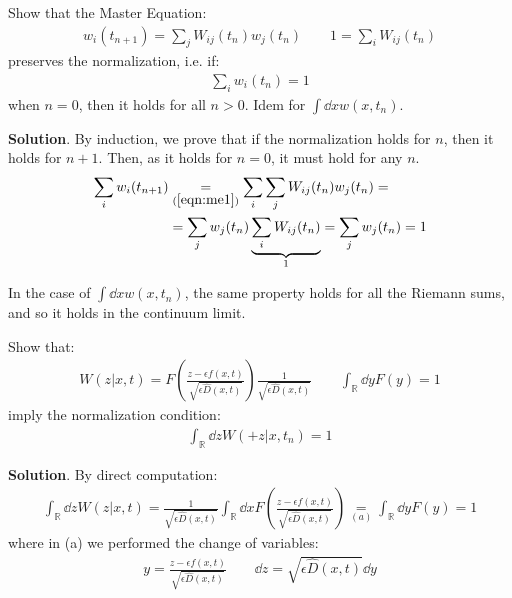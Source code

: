 \documentclass[../template.tex]{subfiles}
\begin{document}
\begin{exo}
    Show that the Master Equation:
    \begin{align}\label{eqn:me1}
        w_i(t_{n+1}) = \sum_{j} W_{ij}(t_n) w_j(t_n) \qquad 1 = \sum_{i} W_{ij}(t_n)
    \end{align}
    preserves the normalization, i.e. if:
    \begin{align*}
        \sum_{i} w_i(t_n) = 1
    \end{align*}
    when $n=0$, then it holds for all $n>0$. Idem for $\int \dd{x} w(x,t_n)$.

    \medskip

    \textbf{Solution}. By induction, we prove that if the normalization holds for $n$, then it holds for $n+1$. Then, as it holds for $n=0$, it must hold for any $n$.
    \begin{align*}
        \sum_{i} w_i(t_{n+1}) &\underset{(\ref{eqn:me1})}{=}   \sum_i \sum_j W_{ij}(t_n) w_j(t_n) =\\
        &= \sum_j w_j(t_n) \underbrace{\sum_i W_{ij}(t_n)}_{1}  = \sum_j w_j(t_n) = 1
    \end{align*}

    In the case of $\int \dd{x} w(x,t_n)$, the same property holds for all the Riemann sums, and so it holds in the continuum limit.
\end{exo}

\begin{exo}
Show that:
\begin{align}\label{eqn:jump}
    W(z|x,t) = F\left(\frac{z-\epsilon f(x,t)}{\sqrt{\epsilon \hat{D}(x,t)}} \right) \frac{1}{\sqrt{\epsilon \hat{D}(x,t)}} \qquad \int_{\mathbb{R}} \dd{y} F(y) = 1
\end{align}
imply the normalization condition:
\begin{align*}
    \int_{\mathbb{R}} \dd{z} W(+z|x,t_n) = 1
\end{align*}   

\medskip

\textbf{Solution}. By direct computation:
\begin{align*}
    \int_{\mathbb{R}} \dd{z} W(z|x,t) = \frac{1}{\sqrt{\epsilon \hat{D}(x,t)}} \int_{\mathbb{R}} \dd{x} F\left(\frac{z-\epsilon f(x,t)}{\sqrt{\epsilon \hat{D}(x,t)}} \right) \underset{(a)}{=} \int_{\mathbb{R}} \dd{y} F(y) = 1
\end{align*} 
where in (a) we performed the change of variables:
\begin{align} \label{eqn:change}
    y = \frac{z-\epsilon f(x,t)}{\sqrt{\epsilon \hat{D}(x,t)}}  \qquad \dd{z} = \sqrt{\epsilon \hat{D}(x,t)} \dd{y} 
\end{align}
\end{exo}
\end{document}
